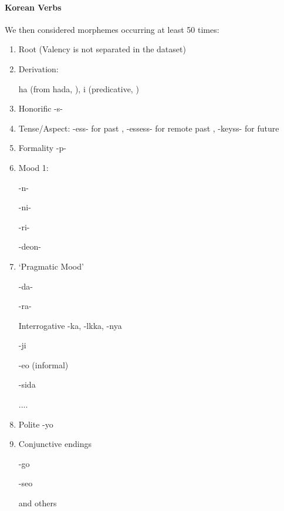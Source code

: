 \documentclass[11pt,letterpaper]{article}
\begin{document}
\paragraph{Korean Verbs}

We then considered morphemes occurring at least 50 times:

\citep{yeon2010korean}

\begin{enumerate}
    \item Root (Valency is not separated in the dataset)
    \item Derivation:
    
    ha (from hada, \citep[4.1.2]{yeon2010korean}), i (predicative, \citep[4.1.4]{yeon2010korean})
    
    \item Honorific -s- \citep[4.3.2, 4.4.1]{yeon2010korean}
    \item Tense/Aspect: -ess- for past \citep[4.5.1.1]{yeon2010korean}, -essess- for remote past \citep[4.5.1.2]{yeon2010korean}, -keyss- for future \citep[4.5.2.1]{yeon2010korean}
    \item Formality -p- \citep[4.3.2]{yeon2010korean}
    \item Mood 1:
    
    -n-
    
    -ni- \citep[4.3.2]{yeon2010korean}
    
    -ri-
    
    -deon-
    
    \item `Pragmatic Mood'
    
    -da- \citep[4.3.2]{yeon2010korean}
    
    -ra- 
    
    Interrogative -ka, -lkka, -nya
    
    -ji \citep[4.2.2-3]{yeon2010korean}
    
    -eo (informal)
    
    -sida \citep[4.3.2]{yeon2010korean}
    
    ....
    
    \item Polite -yo
    \item Conjunctive endings
    
    -go
    
    -seo
    
    and others
    
\end{enumerate}
\end{document}
